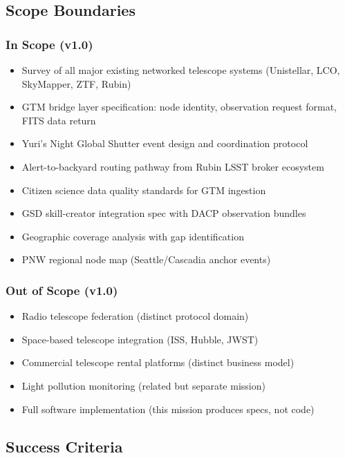 \documentclass[11pt,letterpaper]{article}
\begin{document}
\subsection{Scope Boundaries}

\subsubsection{In Scope (v1.0)}

\begin{itemize}
  \item Survey of all major existing networked telescope systems (Unistellar, LCO, SkyMapper, ZTF, Rubin)
  \item GTM bridge layer specification: node identity, observation request format, FITS data return
  \item Yuri's Night Global Shutter event design and coordination protocol
  \item Alert-to-backyard routing pathway from Rubin LSST broker ecosystem
  \item Citizen science data quality standards for GTM ingestion
  \item GSD skill-creator integration spec with DACP observation bundles
  \item Geographic coverage analysis with gap identification
  \item PNW regional node map (Seattle/Cascadia anchor events)
\end{itemize}

\subsubsection{Out of Scope (v1.0)}

\begin{itemize}
  \item Radio telescope federation (distinct protocol domain)
  \item Space-based telescope integration (ISS, Hubble, JWST)
  \item Commercial telescope rental platforms (distinct business model)
  \item Light pollution monitoring (related but separate mission)
  \item Full software implementation (this mission produces specs, not code)
\end{itemize}

\subsection{Success Criteria}
\end{document}
